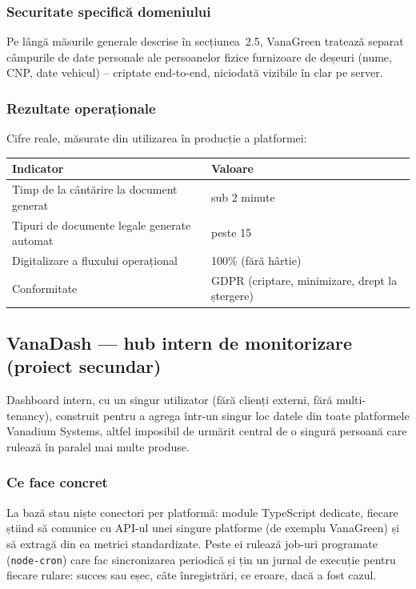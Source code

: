 \documentclass[11pt, a4paper]{article}
\begin{document}
\subsubsection{Securitate specifică domeniului}

Pe lângă măsurile generale descrise în secțiunea~2.5, VanaGreen tratează separat câmpurile de
date personale ale persoanelor fizice furnizoare de deșeuri (nume, CNP, date vehicul) --
criptate end-to-end, niciodată vizibile în clar pe server.

\subsubsection{Rezultate operaționale}

Cifre reale, măsurate din utilizarea în producție a platformei:

\renewcommand{\arraystretch}{1.3}
\begin{tabularx}{\textwidth}{X X}
\toprule
Indicator & Valoare \\
\midrule
Timp de la cântărire la document generat & sub 2 minute \\
Tipuri de documente legale generate automat & peste 15 \\
Digitalizare a fluxului operațional & 100\% (fără hârtie) \\
Conformitate & GDPR (criptare, minimizare, drept la ștergere) \\
\bottomrule
\end{tabularx}

\vspace{1.2em}
\subsection{VanaDash --- hub intern de monitorizare (proiect secundar)}

Dashboard intern, cu un singur utilizator (fără clienți externi, fără multi-tenancy), construit
pentru a agrega într-un singur loc datele din toate platformele Vanadium Systems, altfel
imposibil de urmărit central de o singură persoană care rulează în paralel mai multe produse.

\subsubsection{Ce face concret}

La bază stau niște conectori per platformă: module TypeScript dedicate, fiecare știind să
comunice cu API-ul unei singure platforme (de exemplu VanaGreen) și să extragă din ea metrici
standardizate. Peste ei rulează job-uri programate (\texttt{node-cron}) care fac sincronizarea
periodică și țin un jurnal de execuție pentru fiecare rulare: succes sau eșec, câte înregistrări,
ce eroare, dacă a fost cazul.
\end{document}
